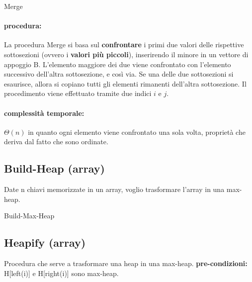\documentclass{article}
\DeclarePairedDelimiter\floor{\lfloor}{\rfloor}
\begin{document}
\begin{algorithm}[H]
\caption{Merge}
\end{algorithm}
\paragraph{procedura:}
La procedura Merge si basa sul \textbf{confrontare} i primi due valori delle rispettive sottosezioni (ovvero i \textbf{valori più piccoli}), inserirendo il minore in un vettore di appoggio B. L'elemento maggiore dei due viene 
confrontato con l'elemento successivo dell'altra sottosezione, e così via. Se una delle due sottosezioni si esaurisce, allora si copiano tutti gli elementi rimanenti dell'altra sottosezione. 
Il procedimento viene effettuato tramite due indici $i$ e $j$.

\paragraph{complessità temporale:} $\Theta(n)$ in quanto ogni elemento viene confrontato una sola volta, proprietà che deriva dal fatto che sono ordinate.


\hypertarget{builheap}{}\subsection{Build-Heap (array)} %
Date n chiavi memorizzate in un array, voglio trasformare l'array in una max-heap.

\begin{algorithm}[H]
\caption{Build-Max-Heap}
\end{algorithm}

\hypertarget{heapify}{}\subsection{Heapify (array)} %
Procedura che serve a trasformare una heap in una max-heap. \newline
\textbf{pre-condizioni:} H[left(i)] e H[right(i)] sono max-heap.
\end{document}
